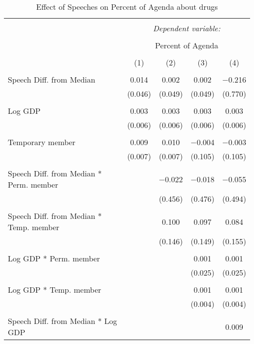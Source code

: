 
\begin{table}[!htbp] \centering 
  \caption{Effect of Speeches on Percent of Agenda about  drugs} 
  \label{} 
\begin{tabular}{@{\extracolsep{5pt}}lcccc} 
\\[-1.8ex]\hline 
\hline \\[-1.8ex] 
 & \multicolumn{4}{c}{\textit{Dependent variable:}} \\ 
\cline{2-5} 
\\[-1.8ex] & \multicolumn{4}{c}{Percent of Agenda} \\ 
\\[-1.8ex] & (1) & (2) & (3) & (4)\\ 
\hline \\[-1.8ex] 
 Speech Diff. from Median & 0.014 & 0.002 & 0.002 & $-$0.216 \\ 
  & (0.046) & (0.049) & (0.049) & (0.770) \\ 
  & & & & \\ 
 Log GDP & 0.003 & 0.003 & 0.003 & 0.003 \\ 
  & (0.006) & (0.006) & (0.006) & (0.006) \\ 
  & & & & \\ 
 Temporary member & 0.009 & 0.010 & $-$0.004 & $-$0.003 \\ 
  & (0.007) & (0.007) & (0.105) & (0.105) \\ 
  & & & & \\ 
 Speech Diff. from Median * Perm. member &  & $-$0.022 & $-$0.018 & $-$0.055 \\ 
  &  & (0.456) & (0.476) & (0.494) \\ 
  & & & & \\ 
 Speech Diff. from Median * Temp. member &  & 0.100 & 0.097 & 0.084 \\ 
  &  & (0.146) & (0.149) & (0.155) \\ 
  & & & & \\ 
 Log GDP * Perm. member &  &  & 0.001 & 0.001 \\ 
  &  &  & (0.025) & (0.025) \\ 
  & & & & \\ 
 Log GDP * Temp. member &  &  & 0.001 & 0.001 \\ 
  &  &  & (0.004) & (0.004) \\ 
  & & & & \\ 
 Speech Diff. from Median * Log GDP &  &  &  & 0.009 \\ 

\end{tabular}
\end{table}
